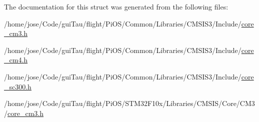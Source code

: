 The documentation for this struct was generated from the following files\-:\begin{DoxyCompactItemize}
\item 
/home/jose/\-Code/gui\-Tau/flight/\-Pi\-O\-S/\-Common/\-Libraries/\-C\-M\-S\-I\-S3/\-Include/\hyperlink{_common_2_libraries_2_c_m_s_i_s3_2_include_2core__cm3_8h}{core\-\_\-cm3.\-h}\item 
/home/jose/\-Code/gui\-Tau/flight/\-Pi\-O\-S/\-Common/\-Libraries/\-C\-M\-S\-I\-S3/\-Include/\hyperlink{core__cm4_8h}{core\-\_\-cm4.\-h}\item 
/home/jose/\-Code/gui\-Tau/flight/\-Pi\-O\-S/\-Common/\-Libraries/\-C\-M\-S\-I\-S3/\-Include/\hyperlink{core__sc300_8h}{core\-\_\-sc300.\-h}\item 
/home/jose/\-Code/gui\-Tau/flight/\-Pi\-O\-S/\-S\-T\-M32\-F10x/\-Libraries/\-C\-M\-S\-I\-S/\-Core/\-C\-M3/\hyperlink{_s_t_m32_f10x_2_libraries_2_c_m_s_i_s_2_core_2_c_m3_2core__cm3_8h}{core\-\_\-cm3.\-h}\end{DoxyCompactItemize}
